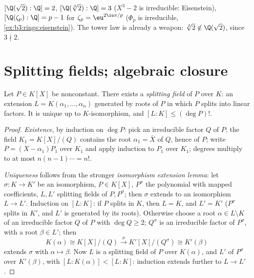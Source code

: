 \begin{example}\label{ex:b3:galois:degrees}
$[\Q(\sqrt2):\Q] = 2$, $[\Q(\sqrt[3]2):\Q] = 3$ ($X^3 - 2$ is
irreducible: Eisenstein), $[\Q(\zeta_p):\Q] = p - 1$ for
$\zeta_p = \eu^{2\iu\pi/p}$ ($\Phi_p$ is irreducible,
\cref{ex:b3:rings:eisenstein}). The tower law is already a
weapon: $\sqrt[3]2 \notin \Q(\sqrt2)$, since $3 \nmid 2$.
\end{example}

\section{Splitting fields; algebraic closure}

\begin{theorem}\label{thm:b3:galois:splitting}
Let $P \in K[X]$ be nonconstant. There exists a \emph{splitting
field} of $P$ over $K$: an extension $L =
K(\alpha_1, \dots, \alpha_n)$ generated by roots of $P$ in which
$P$ splits into linear factors. It is unique up to
$K$-isomorphism, and $[L:K] \leq (\deg P)!$.
\end{theorem}

\begin{proof}
\emph{Existence}, by induction on $\deg P$: pick an irreducible
factor $Q$ of $P$; the field $K_1 = K[X]/(Q)$ contains the root
$\alpha_1 = \bar X$ of $Q$, hence of $P$; write $P = (X -
\alpha_1)P_1$ over $K_1$ and apply induction to $P_1$ over $K_1$;
degrees multiply to at most $n(n-1)\cdots = n!$.

\emph{Uniqueness} follows from the stronger \emph{isomorphism
extension lemma}: let $\sigma \colon K \to K'$ be an isomorphism,
$P \in K[X]$, $P^\sigma$ the polynomial with mapped coefficients,
$L, L'$ splitting fields of $P, P^\sigma$; then $\sigma$ extends
to an isomorphism $L \to L'$. Induction on $[L:K]$: if $P$ splits
in $K$, then $L = K$, and $L' = K'$ ($P^\sigma$ splits in $K'$,
and $L'$ is generated by its roots). Otherwise choose a root
$\alpha \in L \setminus K$ of an irreducible factor $Q$ of $P$
with $\deg Q \geq 2$; $Q^\sigma$ is an irreducible factor of
$P^\sigma$, with a root $\beta \in L'$; then
\[
K(\alpha) \cong K[X]/(Q) \xrightarrow{\ \sigma\ }
K'[X]/(Q^\sigma) \cong K'(\beta)
\]
extends $\sigma$ with $\alpha \mapsto \beta$. Now $L$ is a
splitting field of $P$ over $K(\alpha)$, and $L'$ of $P^\sigma$
over $K'(\beta)$, with $[L : K(\alpha)] < [L:K]$: induction
extends further to $L \to L'$.
\end{proof}

